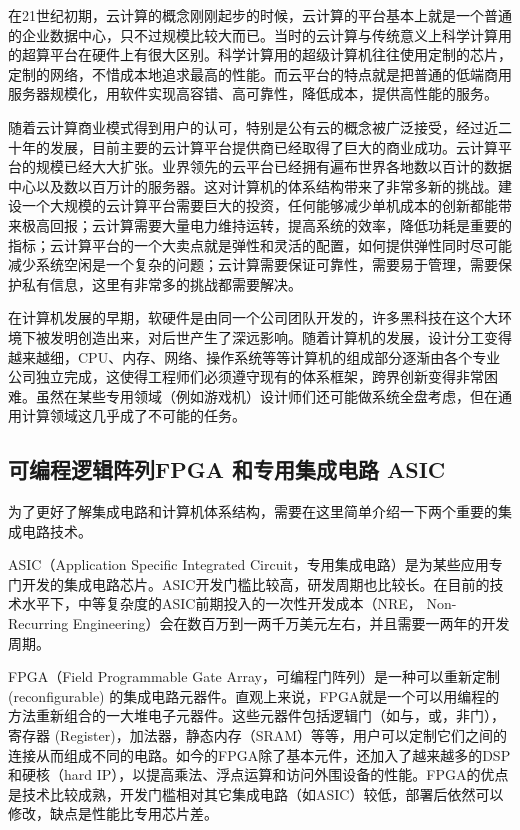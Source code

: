 在21世纪初期，云计算的概念刚刚起步的时候，云计算的平台基本上就是一个普通的企业数据中心，只不过规模比较大而已。当时的云计算与传统意义上科学计算用的超算平台在硬件上有很大区别。科学计算用的超级计算机往往使用定制的芯片，定制的网络，不惜成本地追求最高的性能。而云平台的特点就是把普通的低端商用服务器规模化，用软件实现高容错、高可靠性，降低成本，提供高性能的服务。

随着云计算商业模式得到用户的认可，特别是公有云的概念被广泛接受，经过近二十年的发展，目前主要的云计算平台提供商已经取得了巨大的商业成功。云计算平台的规模已经大大扩张。业界领先的云平台已经拥有遍布世界各地数以百计的数据中心以及数以百万计的服务器。这对计算机的体系结构带来了非常多新的挑战。建设一个大规模的云计算平台需要巨大的投资，任何能够减少单机成本的创新都能带来极高回报；云计算需要大量电力维持运转，提高系统的效率，降低功耗是重要的指标；云计算平台的一个大卖点就是弹性和灵活的配置，如何提供弹性同时尽可能减少系统空闲是一个复杂的问题；云计算需要保证可靠性，需要易于管理，需要保护私有信息，这里有非常多的挑战都需要解决。

在计算机发展的早期，软硬件是由同一个公司团队开发的，许多黑科技在这个大环境下被发明创造出来，对后世产生了深远影响。随着计算机的发展，设计分工变得越来越细，CPU、内存、网络、操作系统等等计算机的组成部分逐渐由各个专业公司独立完成，这使得工程师们必须遵守现有的体系框架，跨界创新变得非常困难。虽然在某些专用领域（例如游戏机）设计师们还可能做系统全盘考虑，但在通用计算领域这几乎成了不可能的任务。


\subsection{可编程逻辑阵列FPGA 和专用集成电路 ASIC}

为了更好了解集成电路和计算机体系结构，需要在这里简单介绍一下两个重要的集成电路技术。

ASIC（Application Specific Integrated Circuit，专用集成电路）是为某些应用专门开发的集成电路芯片。ASIC开发门槛比较高，研发周期也比较长。在目前的技术水平下，中等复杂度的ASIC前期投入的一次性开发成本（NRE， Non-Recurring Engineering）会在数百万到一两千万美元左右，并且需要一两年的开发周期。

FPGA（Field Programmable Gate Array，可编程门阵列）是一种可以重新定制 (reconfigurable) 的集成电路元器件。直观上来说，FPGA就是一个可以用编程的方法重新组合的一大堆电子元器件。这些元器件包括逻辑门（如与，或，非门），寄存器 (Register)，加法器，静态内存（SRAM）等等，用户可以定制它们之间的连接从而组成不同的电路。如今的FPGA除了基本元件，还加入了越来越多的DSP和硬核（hard IP），以提高乘法、浮点运算和访问外围设备的性能。FPGA的优点是技术比较成熟，开发门槛相对其它集成电路（如ASIC）较低，部署后依然可以修改，缺点是性能比专用芯片差。

